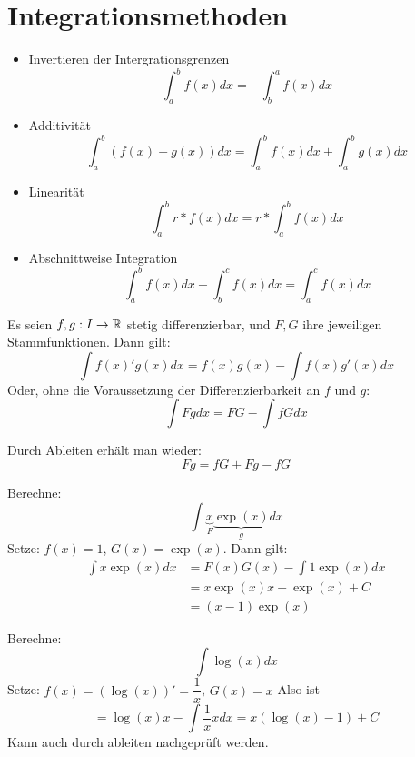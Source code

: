 \documentclass[main.tex]{subfiles}
\begin{document}
\section{Integrationsmethoden}

\begin{Theorem}
  \begin{itemize}
    \item Invertieren der Intergrationsgrenzen
    $$\int_a^b f(x)dx = - \int_b^a f(x)dx$$
    \item Additivität
    $$\int_a^b (f(x)+g(x))dx = \int_a^b f(x)dx + \int_a^b g(x)dx$$
    \item Linearität
    $$\int_a^b r*f(x)dx = r*\int_a^b f(x)dx$$
    \item Abschnittweise Integration
    $$\int_a^b f(x)dx +\int_b^c f(x)dx = \int_a^c f(x)dx$$
  \end{itemize}
\end{Theorem}

\begin{Theorem}
  Es seien $f,g: I \to \mathbb{R}$ stetig differenzierbar, und $F,G$ ihre jeweiligen Stammfunktionen. Dann gilt:
  $$\int f(x)'g(x) dx= f(x)g(x) - \int f(x)g'(x) dx$$
  Oder, ohne die Voraussetzung der Differenzierbarkeit an $f$ und $g$:
  $$\int F g dx = FG - \int f G dx$$
\end{Theorem}

\begin{Beweis}
  Durch Ableiten erhält man wieder:
  $$F g = fG + Fg - fG$$
\end{Beweis}

\begin{Beispiel}
  Berechne:
  $$\int \underbrace{x}_{F} \underbrace{\exp(x)}_{g} dx$$
  Setze: $f(x) = 1$, $G(x) = \exp(x)$. Dann gilt:
  $$\begin{aligned}
    \int x \exp(x) dx &= F(x)G(x) - \int 1 \exp(x)dx \\
    &= x \exp(x) x - \exp(x) + C\\
    &= (x-1) \exp(x)
  \end{aligned}$$
\end{Beispiel}

\begin{Beispiel}
  Berechne:
  $$\int \log(x)dx$$
  Setze: $f(x) = (\log(x))' = \dfrac{1}{x}$, $G(x) = x$
  Also ist
  $$= \log(x)x - \int \dfrac{1}{x}x dx = x (\log(x)-1) + C$$
  Kann auch durch ableiten nachgeprüft werden.
\end{Beispiel}
\end{document}

